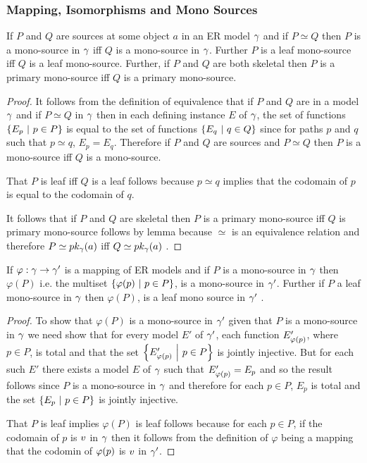 \subsubsection{Mapping, Isomorphisms and Mono Sources}

\begin{lemma}
If  $P$ and $Q$ are sources at some object $a$ in an ER model $\gamma$ and if $P \simeq Q$  then   $P$ is a mono-source in $\gamma$ iff $Q$ is a mono-source in $\gamma$.  Further $P$ is a leaf mono-source iff $Q$ is a leaf mono-source. Further, if $P$ and $Q$ are both skeletal then $P$ is a primary mono-source iff $Q$ is a primary mono-source.
\end{lemma}
\begin{proof}
It follows from the definition of  equivalence  that if $P$ and $Q$ are  in a model $\gamma$ and if $P \simeq Q$ in $\gamma$ then in each defining instance $E$ of $\gamma$, the set of functions $\left\{E_p \ \middle|\ p \in P\right\}$ is equal to the set of functions $\left\{E_q \ \middle|\ q \in Q\right\}$ since for
paths $p$ and $q$ such that $p \simeq q$, $E_p=E_q$. Therefore if $P$ and $Q$ are sources and $P \simeq Q$ then $P$ is a mono-source iff $Q$ is a mono-source.

That $P$ is leaf  iff $Q$ is a leaf 
follows because $p \simeq q$ implies that the codomain of $p$ is equal to the codomain of $q$.

It follows that if $P$ and $Q$ are skeletal then $P$ is a primary mono-source iff $Q$ is  primary mono-source  
follows by lemma  because  $\simeq$ is an equivalence relation and therefore $P \simeq pk_{\gamma}(a)$ iff $Q \simeq pk_{\gamma}(a)$ .
\end{proof}

\begin{lemma}
If $\varphi: \gamma \rightarrow \gamma'$ is a mapping of ER models and
if $P$ is a mono-source in $\gamma$ then  
$\varphi(P)$ i.e. the multiset $\left\{\varphi(p) \ \middle|\ p\in P\right\}$, is a mono-source in $\gamma'$. 
Further if $P$ a leaf mono-source in $\gamma$ then $\varphi(P)$,  is a leaf mono source in $\gamma'$ .
\end{lemma}
\begin{proof}
To show that $\varphi(P)$ is a mono-source in $\gamma'$ given that $P$ is a mono-source in $\gamma$ we need show that for every model $E'$ of $\gamma'$, 
each function $E'_{\varphi(p)}$,  where $p \in P$, is total and that the set
$\left\{E'_{\varphi(p)} \ \middle|\ p \in P\right\}$ is jointly injective. But for each such $E'$ there exists a model $E$ of $\gamma$ such that $E'_{\varphi(p)}=E_{p}$  and so the result follows  since $P$ is a mono-source in $\gamma$ and therefore for each $p \in P$, $E_p$ is total and the set $\left\{E_p \ \middle|\ p\in P\right\}$ is jointly injective.

That $P$ is leaf implies $\varphi(P)$ is leaf follows because for each $p \in P$, if the codomain of $p$ is 
$v$ in $\gamma$ then it follows from the definition of $\varphi$ being a mapping that the codomin of $\varphi(p)$ is  $v$ in $\gamma'$. 
\end{proof}

